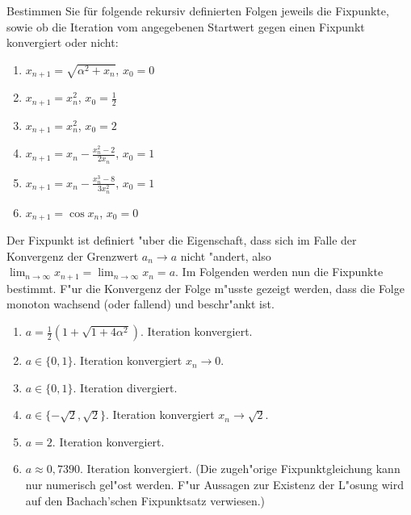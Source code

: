 \documentclass[12pt,answers]{exam}
\begin{document}
\begin{questions}
Bestimmen Sie für folgende rekursiv definierten Folgen jeweils die Fixpunkte, sowie ob die Iteration vom angegebenen Startwert gegen einen Fixpunkt konvergiert oder nicht:\\
\parbox{0.5\textwidth}{\begin{enumerate}
\item $x_{n+1}=\sqrt{\alpha^2+x_n}$, $x_0=0$
\item $x_{n+1}=x_n^2$, $x_0=\frac{1}{2}$
\item $x_{n+1}=x_n^2$, $x_0=2$
\end{enumerate}}\parbox{0.5\textwidth}{\begin{enumerate}\setcounter{enumi}{3}
\item $x_{n+1}=x_n-\frac{x_n^2-2}{2x_n}$, $x_0=1$
\item $x_{n+1}=x_n-\frac{x_n^3-8}{3x_n^2}$, $x_0=1$
\item $x_{n+1}=\cos x_n$, $x_0=0$
\end{enumerate}}
\begin{solution}Der Fixpunkt ist definiert "uber die Eigenschaft, dass sich im Falle der Konvergenz der Grenzwert $a_n\to a$ nicht "andert, 
also $\lim_{n\to\infty}x_{n+1}=\lim_{n\to\infty}x_{n}=a$. Im Folgenden werden nun die Fixpunkte bestimmt. F"ur die Konvergenz der Folge m"usste gezeigt werden, dass die Folge monoton wachsend (oder fallend) und beschr"ankt ist.
\begin{enumerate}
\item $a=\frac{1}{2}\left(1+\sqrt{1+4\alpha^2}\right)$. Iteration konvergiert. 
\item $a\in\{0,1\}$. Iteration konvergiert $x_n\to 0$.
\item $a\in\{0,1\}$. Iteration divergiert.
\item $a\in\{-\sqrt{2},\sqrt{2}\}$. Iteration konvergiert $x_n\to\sqrt{2}$.
\item $a=2$. Iteration konvergiert.
\item $a\approx 0,7390$. Iteration konvergiert. (Die zugeh"orige Fixpunktgleichung kann nur numerisch gel"ost werden. F"ur Aussagen zur Existenz der L"osung wird auf den Bachach'schen Fixpunktsatz verwiesen.)
\end{enumerate}
\end{solution}






\end{questions}
\end{document}
